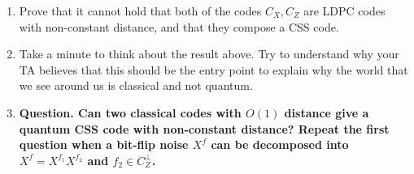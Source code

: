 \documentclass[12pt,a4paper]{article}
\begin{document}
\begin{enumerate}
  \item Prove that it cannot hold that both of the codes $C_{X}, C_{Z}$ are LDPC codes with non-constant distance, and that they compose a CSS code.



  \item Take a minute to think about the result above. Try to understand why your TA believes that this should be the entry point to explain why the world that we see around us is classical and not quantum.


  \item \textbf{Question. Can two classical codes with $O(1)$ distance give a quantum CSS code with non-constant distance? Repeat the first question when a bit-flip noise $X^f$ can be decomposed into $X^f = X^{f_{1}} X^{f_{2}}$ and $f_{2} \in C_{Z}^\perp$.} 



\end{enumerate}
\end{document}
